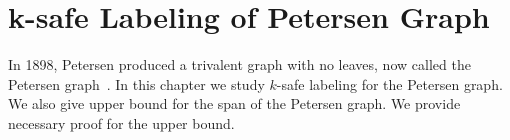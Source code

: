 \chapter{k-safe Labeling of Petersen Graph}\label{safeklabelingpetersen}

In 1898, Petersen produced a trivalent graph with no leaves, now
called the Petersen graph~\cite{holton1993petersen}.  In this chapter
we study $k$-safe labeling for the Petersen graph. We also give upper
bound for the span of the Petersen graph. We provide necessary proof
for the upper bound.

\endinput

